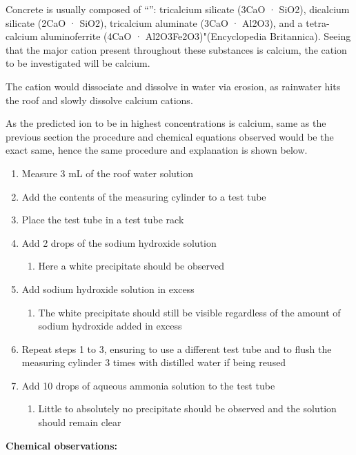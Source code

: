 \documentclass[11pt, a4]{article}
\begin{document}
				Concrete is usually composed of ``'': tricalcium silicate (3CaO · SiO2), dicalcium silicate (2CaO · SiO2), tricalcium aluminate (3CaO · Al2O3), and a tetra-calcium aluminoferrite (4CaO · Al2O3Fe2O3)"(Encyclopedia Britannica). Seeing that the major cation present throughout these substances is calcium, the cation to be investigated will be calcium.

				The cation would dissociate and dissolve in water via erosion, as rainwater hits the roof and slowly dissolve calcium cations.

					As the predicted ion to be in highest concentrations is calcium, same as the previous section the procedure and chemical equations observed would be the exact same, hence the same procedure and explanation is shown below.
					\begin{enumerate}
						\item Measure 3 mL of the roof water solution
						\item Add the contents of the measuring cylinder to a test tube
						\item Place the test tube in a test tube rack
						\item Add 2 drops of the sodium hydroxide solution
							\begin{enumerate}
								\item Here a white precipitate should be observed
							\end{enumerate}
						\item Add sodium hydroxide solution in excess
							\begin{enumerate}
								\item The white precipitate should still be visible regardless of the amount of sodium hydroxide added in excess
							\end{enumerate}
						\item Repeat steps 1 to 3, ensuring to use a different test tube and to flush the measuring cylinder 3 times with distilled water if being reused
						\item Add 10 drops of aqueous ammonia solution to the test tube
						\begin{enumerate}
							\item Little to absolutely no precipitate should be observed and the solution should remain clear
						\end{enumerate}
					\end{enumerate}
				
				\noindent \textbf{Chemical observations:}
	
\end{document}

